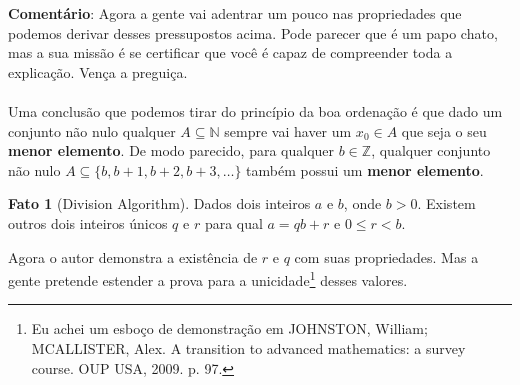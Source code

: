 \documentclass[a4paper,11pt]{book}
\theoremstyle{definition}
\theoremstyle{break}
\newtheorem{fact}{Fato}[section]
\begin{document}
\textbf{Comentário}: Agora a gente vai adentrar um pouco nas propriedades que podemos derivar desses pressupostos acima. Pode parecer que é um papo chato, mas a sua missão é se certificar que você é capaz de compreender toda a explicação. Vença a preguiça.
\\
\\
Uma conclusão que podemos tirar do princípio da boa ordenação é que dado um conjunto não nulo qualquer $A \subseteq \mathbb{N}$ sempre vai haver um $x_0 \in A$ que seja o seu \textbf{menor elemento}. De modo parecido, para qualquer $b \in \mathbb{Z}$, qualquer conjunto não nulo $A \subseteq \{ b, b+1, b+2, b+3, \dots \}$ também possui um \textbf{menor elemento}.

\begin{fact}[Division Algorithm]
Dados dois inteiros $a$ e $b$, onde $b > 0$. Existem outros dois inteiros únicos $q$ e $r$ para qual $a = qb + r$ e $0 \leq r < b$.
\end{fact}

Agora o autor demonstra a existência de $r$ e $q$ com suas propriedades. Mas a gente pretende estender a prova para a unicidade\footnote{Eu achei um esboço de demonstração em JOHNSTON, William; MCALLISTER, Alex. A transition to advanced mathematics: a survey course. OUP USA, 2009. p. 97.} desses valores.
\end{document}
